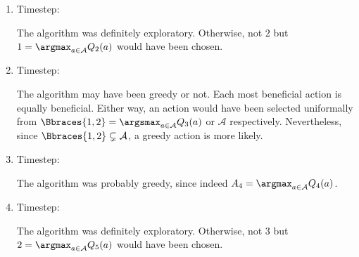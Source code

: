 \begin{solution}
\begin{enumerate}[label = \arabic*.]
    \item Timestep:
    
    The algorithm was definitely exploratory.
    Otherwise, not $2$ but $1 = \argmax_{a \in \mathcal A} Q_2(a)$ would have been chosen.

    \item Timestep:
    
    The algorithm may have been greedy or not.
    Each most beneficial action is equally beneficial.
    Either way, an action would have been selected uniformally from $\Bbraces{1, 2} = \argsmax_{a \in \mathcal A} Q_3(a)$ or $\mathcal A$ respectively.
    Nevertheless, since $\Bbraces{1, 2} \subsetneq \mathcal A$, a greedy action is more likely.

    \item Timestep:
    
    The algorithm was probably greedy, since indeed $A_4 = \argmax_{a \in \mathcal A} Q_4(a)$.
    
    \item Timestep:
    
    The algorithm was definitely exploratory.
    Otherwise, not $3$ but $2 = \argmax_{a \in \mathcal A} Q_5(a)$ would have been chosen.

\end{enumerate}

\end{solution}

